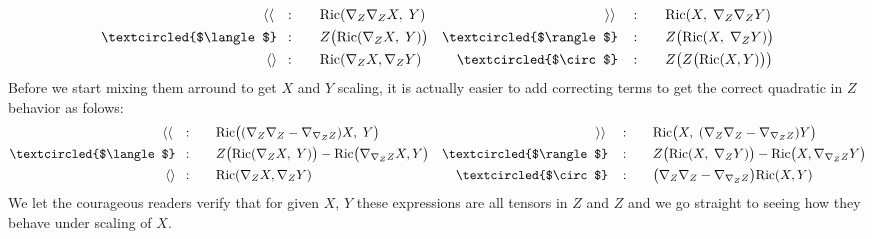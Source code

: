 \documentclass[a4paper,11pt]{article}
\newcommand{\R}{{\mathrm{Ric}}}
\begin{document}
\begin{align*}
    \langle\langle \quad:\quad&\quad
    \R(\nabla_Z\nabla_Z X,\;Y)
    &\rangle\rangle \quad:\quad&\quad
    \R(X,\;\nabla_Z\nabla_ZY)\\
    \textcircled{$\langle$}\!\!\! \quad:\quad&\quad
    Z\big(\R(\nabla_Z X,\;Y)\big)
    &\textcircled{$\rangle$}\! \quad:\quad&\quad
    Z\big(\R( X,\;\nabla_ZY)\big)\\
    \langle\rangle \!\!\!\quad:\quad&\quad
    \R(\nabla_Z X, \nabla_Z Y)
    & \textcircled{$\circ$}\! \quad:\quad&\quad
    Z\big(Z\big(\R(X,Y)\big)\big)
\end{align*}
Before we start mixing them arround to get $X$ and $Y$ scaling, it is actually easier to add correcting terms to get the correct quadratic in $Z$ behavior as folows:
\begin{align*}
    \langle\langle \quad:\quad&\quad
    \R\big((\nabla_Z\nabla_Z-\nabla_{\nabla_Z Z}) X,\;Y\big)
    &\rangle\rangle \quad:\quad&\quad
    \R\big(X,\;(\nabla_Z\nabla_Z-\nabla_{\nabla_Z Z})Y\big)\\
    \textcircled{$\langle$}\!\!\! \quad:\quad&\quad
    Z\big(\R(\nabla_Z X,\;Y)\big) - \R\big(\nabla_{\nabla_ZZ}X,Y\big)
    &\textcircled{$\rangle$}\! \quad:\quad&\quad
    Z\big(\R( X,\;\nabla_ZY)\big)- \R\big(X,\nabla_{\nabla_ZZ}Y\big)\\
    \langle\rangle \!\!\!\quad:\quad&\quad
    \R(\nabla_Z X, \nabla_Z Y)
    & \textcircled{$\circ$}\! \quad:\quad&\quad
    \big(\nabla_Z\nabla_Z-\nabla_{\nabla_Z Z}\big)\R(X,Y)
\end{align*}
We let the courageous readers verify that for given $X$, $Y$ these expressions are all tensors in $Z$ and $Z$ and we go straight to seeing how they behave under scaling of $X$.
\end{document}
